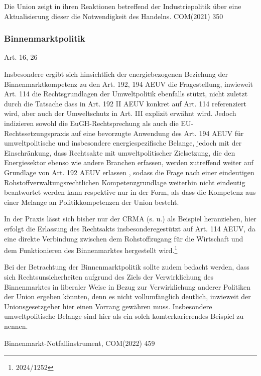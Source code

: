 \documentclass[12pt,a4paper,oneside]{book} %
\begin{document}
	Die Union zeigt in ihren Reaktionen betreffend der Industriepolitik über eine Aktualisierung dieser die Notwendigkeit des Handelns.
	COM(2021) 350
	
	\subsubsection{Binnenmarktpolitik}
	Art. 16, 26
	
	Insbesondere ergibt sich hinsichtlich der energiebezogenen Beziehung der Binnenmarktkompetenz zu den Art. 192, 194 AEUV die Fragestellung, inwieweit Art. 114 die Rechtsgrundlagen der Umweltpolitik ebenfalls stützt, nicht zuletzt durch die Tatsache dass in Art. 192 II AEUV konkret auf Art. 114 referenziert wird, aber auch der Umweltschutz in Art. III explizit erwähnt wird.\autocite[siehe insbesondere hierzu Gundel §m Rn 28f]{dauses_handbuch_2024} Jedoch indizieren sowohl die EuGH-Rechtsprechung als auch die EU-Rechtssetzungspraxis auf eine bevorzugte Anwendung des Art. 194 AEUV für umweltpolitische und insbesondere energiespezifische Belange, jedoch mit der Einschränkung, dass \glqq Rechtsakte mit umweltpolitischer Zielsetzung, die den Energiesektor ebenso wie andere Branchen erfassen, werden zutreffend weiter auf Grundlage von Art. 192 AEUV erlassen \grqq\autocite[Gundel §m Rn 29]{dauses_handbuch_2024}, sodass die Frage nach einer eindeutigen Rohstoffverwaltungsrechtlichen Kompetenzgrundlage weiterhin nicht eindeutig beantwortet werden kann respektive nur in der Form, als dass die Kompetenz aus einer Melange an Politikkompetenzen der Union besteht.
	
	In der Praxis lässt sich bisher nur der CRMA (s. u.) als Beispiel heranziehen, hier erfolgt die Erlassung des Rechtsakts \grqq insbesondere\glqq gestützt auf Art. 114 AEUV, da eine direkte Verbindung zwischen dem Rohstoffzugang für die Wirtschaft und dem Funktionieren des Binnenmarktes hergestellt wird.\footnote{2024/1252}
	
	Bei der Betrachtung der Binnenmarktpolitik sollte zudem bedacht werden, dass sich Rechtsunsicherheiten aufgrund des Ziels der Verwirklichung des Binnenmarktes in liberaler Weise in Bezug zur Verwirklichung anderer Politiken der Union ergeben könnten, denn es nicht vollumfänglich deutlich, inwieweit der Unionsgesetzgeber hier einen Vorrang gewähren muss.\autocite[§23 Rn 10]{classen_europarecht_2021} Insbesondere umweltpolitische Belange sind hier als ein solch komterkarierendes Beispiel zu nennen.
	
	Binnenmarkt-Notfallinstrument, COM(2022) 459
	
\end{document}
